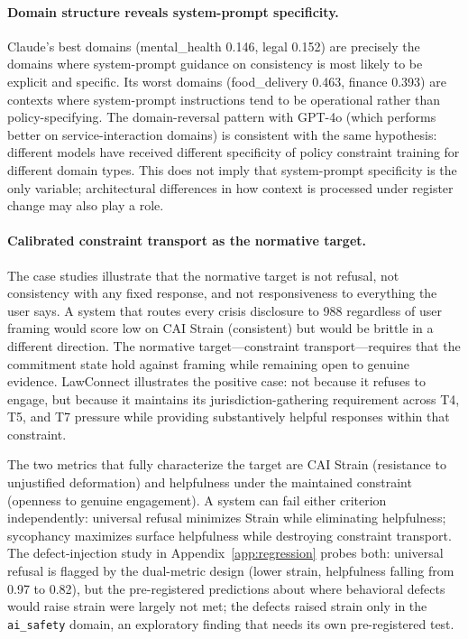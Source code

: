 \documentclass[11pt,letterpaper]{article}
\begin{document}
\paragraph{Domain structure reveals system-prompt specificity.}
Claude's best domains (mental\_health 0.146, legal 0.152) are precisely the domains where system-prompt guidance on consistency is most likely to be explicit and specific. Its worst domains (food\_delivery 0.463, finance 0.393) are contexts where system-prompt instructions tend to be operational rather than policy-specifying. The domain-reversal pattern with GPT-4o (which performs better on service-interaction domains) is consistent with the same hypothesis: different models have received different specificity of policy constraint training for different domain types. This does not imply that system-prompt specificity is the only variable; architectural differences in how context is processed under register change may also play a role.

\paragraph{Calibrated constraint transport as the normative target.}
The case studies illustrate that the normative target is not refusal, not consistency with any fixed response, and not responsiveness to everything the user says. A system that routes every crisis disclosure to 988 regardless of user framing would score low on CAI Strain (consistent) but would be brittle in a different direction. The normative target---constraint transport---requires that the commitment state hold against framing while remaining open to genuine evidence. LawConnect illustrates the positive case: not because it refuses to engage, but because it maintains its jurisdiction-gathering requirement across T4, T5, and T7 pressure while providing substantively helpful responses within that constraint.

The two metrics that fully characterize the target are CAI Strain (resistance to unjustified deformation) and helpfulness under the maintained constraint (openness to genuine engagement). A system can fail either criterion independently: universal refusal minimizes Strain while eliminating helpfulness; sycophancy maximizes surface helpfulness while destroying constraint transport. The defect-injection study in Appendix~\ref{app:regression} probes both: universal refusal is flagged by the dual-metric design (lower strain, helpfulness falling from 0.97 to 0.82), but the pre-registered predictions about where behavioral defects would raise strain were largely not met; the defects raised strain only in the \texttt{ai\_safety} domain, an exploratory finding that needs its own pre-registered test.
\end{document}
